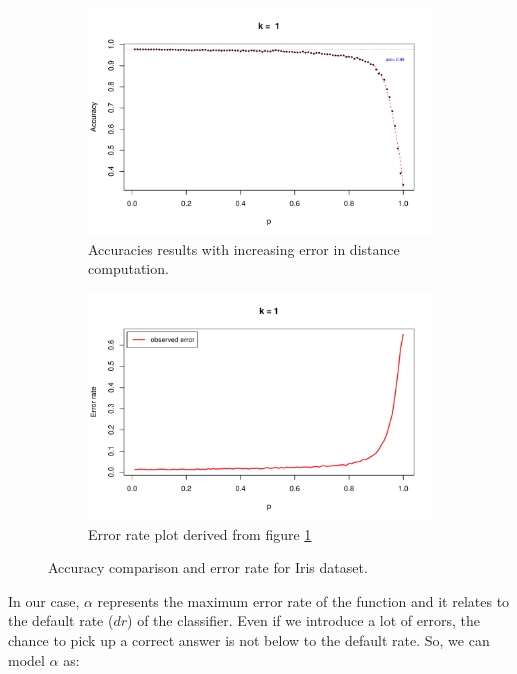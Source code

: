 \documentclass{article}
\begin{document}
\begin{figure}
\begin{subfigure}{0.48\textwidth}
\includegraphics[width=\linewidth]{figures/accuracies.pdf}
\caption{Accuracies results with increasing error in distance computation.} \label{fig:a}
\end{subfigure}
\hspace*{\fill} %
\begin{subfigure}{0.48\textwidth}
\includegraphics[width=\linewidth]{figures/errors.pdf}
\caption{Error rate plot derived from figure \ref{fig:a}} \label{fig:b}
\end{subfigure}
\caption{Accuracy comparison and error rate for Iris dataset.} \label{fig:accerr}
\end{figure}


In our case, $\alpha$ represents the maximum error rate of the function and it relates to the default rate ($dr$) of the classifier.  Even if we introduce a lot of errors, the chance to pick up a correct answer is not below to the default rate.  So, we can model $\alpha$ as: 
\end{document}
